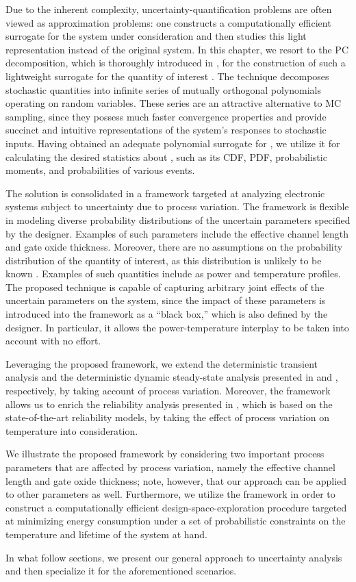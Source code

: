 Due to the inherent complexity, uncertainty-quantification problems are often
viewed as approximation problems: one constructs a computationally efficient
surrogate for the system under consideration and then studies this light
representation instead of the original system. In this chapter, we resort to the
\ac{PC} decomposition, which is thoroughly introduced in
, for the construction of such a lightweight surrogate
for the quantity of interest \g. The technique decomposes stochastic quantities
into infinite series of mutually orthogonal polynomials operating on random
variables. These series are an attractive alternative to \ac{MC} sampling, since
they possess much faster convergence properties and provide succinct and
intuitive representations of the system's responses to stochastic inputs. Having
obtained an adequate polynomial surrogate for \g, we utilize it for calculating
the desired statistics about \g, such as its \ac{CDF}, \ac{PDF}, probabilistic
moments, and probabilities of various events.

The solution is consolidated in a framework targeted at analyzing electronic
systems subject to uncertainty due to process variation. The framework is
flexible in modeling diverse probability distributions of the uncertain
parameters specified by the designer. Examples of such parameters include the
effective channel length and gate oxide thickness. Moreover, there are no
assumptions on the probability distribution of the quantity of interest, as this
distribution is unlikely to be known \apriori. Examples of such quantities
include as power and temperature profiles. The proposed technique is capable of
capturing arbitrary joint effects of the uncertain parameters on the system,
since the impact of these parameters is introduced into the framework as a
``black box,'' which is also defined by the designer. In particular, it allows
the power-temperature interplay to be taken into account with no effort.

Leveraging the proposed framework, we extend the deterministic transient
analysis and the deterministic dynamic steady-state analysis presented in
 and , respectively, by
taking account of process variation. Moreover, the framework allows us to enrich
the reliability analysis presented in , which is based
on the state-of-the-art reliability models, by taking the effect of process
variation on temperature into consideration.

We illustrate the proposed framework by considering two important process
parameters that are affected by process variation, namely the effective channel
length and gate oxide thickness; note, however, that our approach can be applied
to other parameters as well. Furthermore, we utilize the framework in order to
construct a computationally efficient design-space-exploration procedure
targeted at minimizing energy consumption under a set of probabilistic
constraints on the temperature and lifetime of the system at hand.

In what follow sections, we present our general approach to uncertainty analysis
and then specialize it for the aforementioned scenarios.
